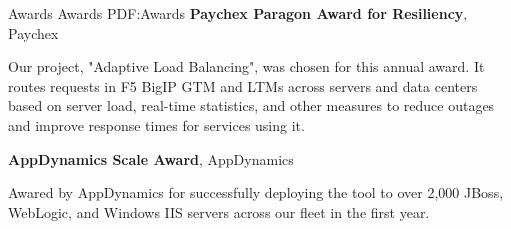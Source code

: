 \documentclass[letterpaper,MMMMyyyy,nonstopmode]{simpleresumecv}
\begin{document}
\begin{Body}
\Section
{Awards}
{Awards}
{PDF:Awards}
\textbf{Paychex Paragon Award for Resiliency}, Paychex
\hfill
{}
\begin{Detail}
Our project, "Adaptive Load Balancing", was chosen for this annual award. 
It routes requests in F5 BigIP GTM and LTMs across servers and data centers based on server load, real-time statistics, and other measures to reduce outages and improve response times for services using it.
\end{Detail}
\BigGap

\textbf{AppDynamics Scale Award}, AppDynamics
\hfill
{}
\begin{Detail}
Awared by AppDynamics for successfully deploying the tool to over 2,000 JBoss, WebLogic, and Windows IIS servers across our fleet in the first year.
\end{Detail}


\iffalse
\Section
{Publications}
{Publications}
{PDF:Publications}

\SubSection
{Technical Editor}
{Technical Editor}
{PDF:TechnicalEditor}

\Entry
\href{https://www.amazon.com/Oracle-Certified-Associate-ProgrammerStudy/dp/1849687323}
{Reece, Richard M. \textit{Oracle Certified Associate, Java SE 7 Programmer Study Guide}, Packt Publishing, 2012}

\Gap
\Entry
\href
{https://www.amazon.com/Java-Concurrency-Cookbook-FernandezJavier/dp/1849687889}
{Gonzalez, Javier Fernandez. \textit{Java 7 Concurrency Cookbook}, Packt Publishing, 2012}
\fi




\iffalse
\newpage
\begingroup
\color{red}


\end{Body}
\end{document}
